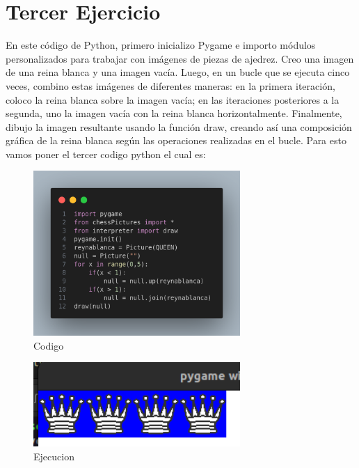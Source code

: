 \documentclass[10pt, a4paper]{article}
\begin{document}
\section{Tercer Ejercicio}
En este código de Python, primero inicializo Pygame e importo módulos personalizados para trabajar con imágenes de piezas de ajedrez. Creo una imagen de una reina blanca y una imagen vacía. Luego, en un bucle que se ejecuta cinco veces, combino estas imágenes de diferentes maneras: en la primera iteración, coloco la reina blanca sobre la imagen vacía; en las iteraciones posteriores a la segunda, uno la imagen vacía con la reina blanca horizontalmente. Finalmente, dibujo la imagen resultante usando la función draw, creando así una composición gráfica de la reina blanca según las operaciones realizadas en el bucle.
\singlespacing
Para esto vamos poner el tercer codigo python el cual es:  
\begin{figure}[H]
  \centering
  \includegraphics[width=0.7\textwidth]{img/Ej3.png}
  \caption{Codigo}
\end{figure}

\begin{figure}[H]
  \centering
  \includegraphics[width=0.7\textwidth]{img/Ejercicio3.png}
  \caption{Ejecucion}
\end{figure}
\end{document}
